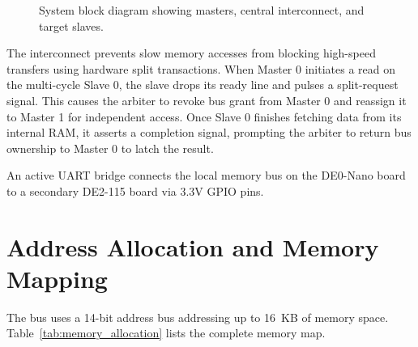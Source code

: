 \documentclass[11pt,a4paper]{article}
\begin{document}
\begin{figure}[h!]
\caption{System block diagram showing masters, central interconnect, and target slaves.}
\label{fig:overall_arch}
\end{figure}

The interconnect prevents slow memory accesses from blocking high-speed transfers using hardware split transactions. When Master 0 initiates a read on the multi-cycle Slave 0, the slave drops its ready line and pulses a split-request signal. This causes the arbiter to revoke bus grant from Master 0 and reassign it to Master 1 for independent access. Once Slave 0 finishes fetching data from its internal RAM, it asserts a completion signal, prompting the arbiter to return bus ownership to Master 0 to latch the result.

An active UART bridge connects the local memory bus on the DE0-Nano board to a secondary DE2-115 board via 3.3V GPIO pins.

\section{Address Allocation and Memory Mapping}

The bus uses a 14-bit address bus addressing up to 16~KB of memory space. Table~\ref{tab:memory_allocation} lists the complete memory map.
\end{document}
